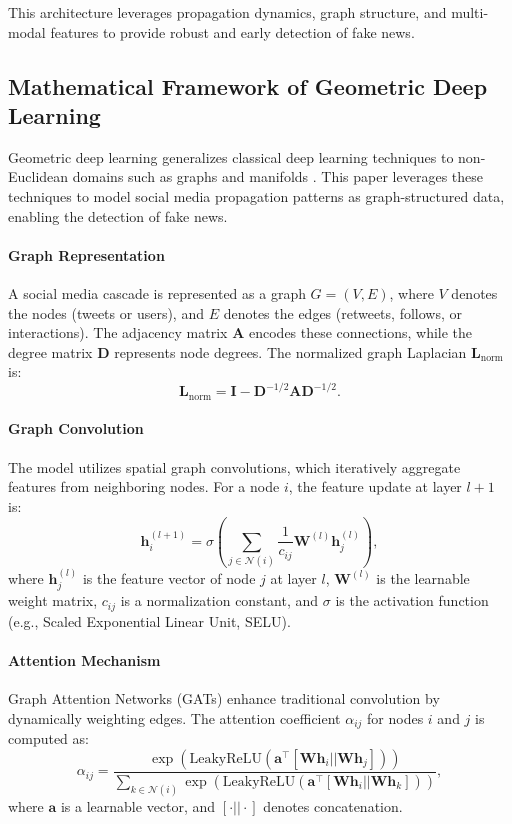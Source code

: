 \documentclass[sigconf,nonacm]{acmart}
\begin{document}
This architecture leverages propagation dynamics, graph structure, and multi-modal features to provide robust and early detection of fake news.




\subsection{Mathematical Framework of Geometric Deep Learning}
Geometric deep learning generalizes classical deep learning techniques \cite{LeCun2015DeepLearning} to non-Euclidean domains such as graphs and manifolds \cite{Bruna2014SpectralNetworks}. This paper leverages these techniques to model social media propagation patterns as graph-structured data, enabling the detection of fake news.

\paragraph{Graph Representation}
A social media cascade is represented as a graph \( G = (V, E) \), where \( V \) denotes the nodes (tweets or users), and \( E \) denotes the edges (retweets, follows, or interactions). The adjacency matrix \( \bm{A} \) encodes these connections, while the degree matrix \( \bm{D} \) represents node degrees. The normalized graph Laplacian \( \bm{L}_{\text{norm}} \) is:
\[
\bm{L}_{\text{norm}} = \bm{I} - \bm{D}^{-1/2} \bm{A} \bm{D}^{-1/2}.
\]

\paragraph{Graph Convolution}
The model utilizes spatial graph convolutions, which iteratively aggregate features from neighboring nodes. For a node \( i \), the feature update at layer \( l+1 \) is:
\[
\bm{h}_i^{(l+1)} = \sigma \left( \sum_{j \in \mathcal{N}(i)} \frac{1}{c_{ij}} \bm{W}^{(l)} \bm{h}_j^{(l)} \right),
\]
where \( \bm{h}_j^{(l)} \) is the feature vector of node \( j \) at layer \( l \), \( \bm{W}^{(l)} \) is the learnable weight matrix, \( c_{ij} \) is a normalization constant, and \( \sigma \) is the activation function (e.g., Scaled Exponential Linear Unit, SELU).

\paragraph{Attention Mechanism}
Graph Attention Networks (GATs) enhance traditional convolution by dynamically weighting edges. The attention coefficient \( \alpha_{ij} \) for nodes \( i \) and \( j \) is computed as:
\[
\alpha_{ij} = \frac{\exp(\text{LeakyReLU}(\bm{a}^\top [\bm{W} \bm{h}_i || \bm{W} \bm{h}_j]))}{\sum_{k \in \mathcal{N}(i)} \exp(\text{LeakyReLU}(\bm{a}^\top [\bm{W} \bm{h}_i || \bm{W} \bm{h}_k]))},
\]
where \( \bm{a} \) is a learnable vector, and \( [\cdot || \cdot] \) denotes concatenation.
\end{document}
